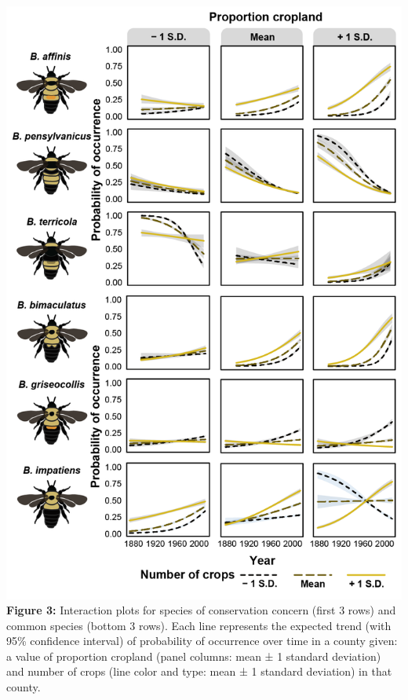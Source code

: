 \documentclass[11pt,]{article}
\begin{document}
\includegraphics[width=1\textwidth,height=\textheight]{../ms_figs/fig_3.png}
\textbf{Figure 3:} Interaction plots for species of conservation concern
(first 3 rows) and common species (bottom 3 rows). Each line represents
the expected trend (with 95\% confidence interval) of probability of
occurrence over time in a county given: a value of proportion cropland
(panel columns: mean ± 1 standard deviation) and number of crops (line
color and type: mean ± 1 standard deviation) in that county. \clearpage

\newpage
\end{document}
